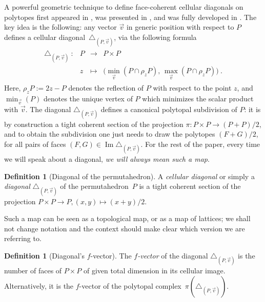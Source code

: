\documentclass{amsart}
\theoremstyle{definition}
\newtheorem{definition}[theorem]{Definition}
\DeclareMathOperator{\Ima}{Im} %
\begin{document}
A powerful geometric technique to define face-coherent cellular diagonals on polytopes first appeared in \cite{fultonIntersectionTheoryToric1997a}, was presented in \cite{masudaDiagonalAssociahedra2021}, and was fully developed in \cite{LA21}.
The key idea is the following: any vector $\vec v$ in generic position with respect to $P$ defines a cellular diagonal~$\triangle_{(P,\vec v)}$, via the following formula
\begin{align*}
    \begin{array}{rlcl}
    \triangle_{(P,\vec v)}\  : & P &\to  &P\times P\\
    &z & \mapsto& 
    \bigl(\min_{\vec v}(P\cap \rho_z P),\,  \max_{\vec v}(P\cap \rho_z P)\bigr) \ .
    \end{array}
\end{align*}
Here, $\rho_z P := 2z-P$ denotes the reflection of $P$ with respect to the point $z$, and $\min_{\vec v}(P)$ denotes the unique vertex of $P$ which minimizes the scalar product with $\vec v$. 
The diagonal $\triangle_{(P,\vec v)}$ defines a canonical polytopal subdivision of $P$: it is by construction a tight coherent section of the projection $\pi : P \times P \to (P+P)/2$, and to obtain the subdivision one just needs to draw the polytopes $(F+G)/2$, for all pairs of faces $(F,G) \in \Ima \triangle_{(P,\vec v)}$.
For the rest of the paper, every time we will speak about a diagonal, \emph{we will always mean such a map}. 

\begin{definition}[Diagonal of the permutahedron]
    \label{def:diagonal}
    A \emph{cellular diagonal} or simply a \emph{diagonal} $\triangle_{(P,\vec v)}$ of the permutahedron~$P$ is a tight coherent section of the projection $P \times P \to P, (x,y) \mapsto (x+y)/2$.
\end{definition}

Such a map can be seen as a topological map, or as a map of lattices; we shall not change notation and the context should make clear which version we are referring to.

\begin{definition}[Diagonal's $f$-vector]
    The \emph{$f$-vector} of the diagonal $\triangle_{(P,\vec v)}$ is the number of faces of $P\times P$ of given total dimension in its cellular image.
    Alternatively, it is the $f$-vector of the polytopal complex~$\pi (\triangle_{(P,\vec v)})$.
\end{definition}
\end{document}
